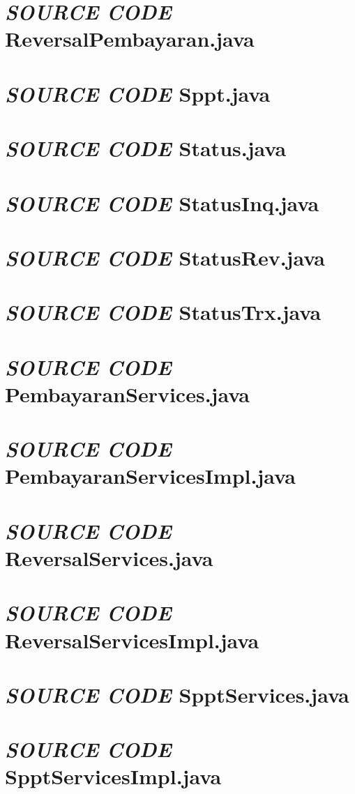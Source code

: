 \documentclass[pdftex,12pt, oneside]{article}
\begin{document}
\section{\textit{SOURCE CODE} ReversalPembayaran.java}


\section{\textit{SOURCE CODE} Sppt.java}


\section{\textit{SOURCE CODE} Status.java}


\section{\textit{SOURCE CODE} StatusInq.java}


\section{\textit{SOURCE CODE} StatusRev.java}


\section{\textit{SOURCE CODE} StatusTrx.java}


\section{\textit{SOURCE CODE} PembayaranServices.java}


\section{\textit{SOURCE CODE} PembayaranServicesImpl.java}


\section{\textit{SOURCE CODE} ReversalServices.java}


\section{\textit{SOURCE CODE} ReversalServicesImpl.java}


\section{\textit{SOURCE CODE} SpptServices.java}


\section{\textit{SOURCE CODE} SpptServicesImpl.java}
\end{document}
